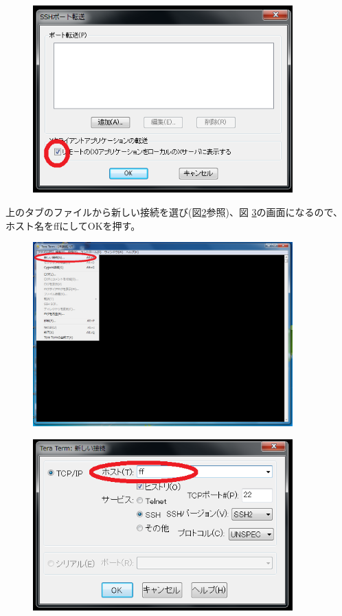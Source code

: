 \documentclass[12pt,a4paper,dvipdfmx]{jarticle}
\begin{document}
\begin{figure}
  \begin{center}
    \includegraphics[clip, width=10.0cm]{./fig/teraterm3_.png}
  \end{center}
  \caption{}
  \label{fig:teraterm3}
\end{figure}

上のタブのファイルから新しい接続を選び(図\ref{fig:teraterm4}参照)、図
\ref{fig:teraterm5}の画面になるので、ホスト名をffにしてOKを押す。

\begin{figure}
  \begin{center}
    \includegraphics[clip, width=10.0cm]{./fig/teraterm4_.png}
  \end{center}
  \caption{}
  \label{fig:teraterm4}
\end{figure}

\begin{figure}
  \begin{center}
    \includegraphics[clip, width=10.0cm]{./fig/teraterm5_.png}
  \end{center}
  \caption{}
  \label{fig:teraterm5}
\end{figure}
\end{document}
